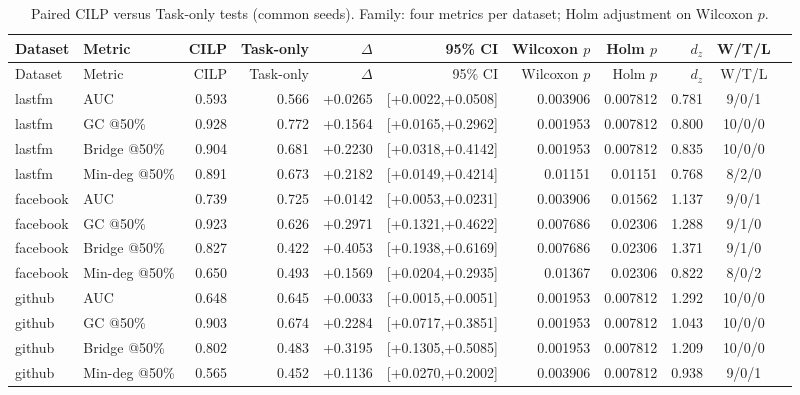 \begin{center}\scriptsize
\begin{longtable}{@{}llrrrrrrrcc@{}}
\caption{Paired CILP versus Task-only tests (common seeds). Family: four metrics per dataset; Holm adjustment on Wilcoxon $p$.}\\
\toprule
Dataset & Metric & CILP & Task-only & $\Delta$ & 95\% CI & Wilcoxon $p$ & Holm $p$ & $d_z$ & W/T/L \\
\midrule
\endfirsthead
\toprule
Dataset & Metric & CILP & Task-only & $\Delta$ & 95\% CI & Wilcoxon $p$ & Holm $p$ & $d_z$ & W/T/L \\
\midrule
\endhead
lastfm & AUC & 0.593 & 0.566 & +0.0265 & [+0.0022,+0.0508] & 0.003906 & 0.007812 & 0.781 & 9/0/1 \\
lastfm & GC @50\% & 0.928 & 0.772 & +0.1564 & [+0.0165,+0.2962] & 0.001953 & 0.007812 & 0.800 & 10/0/0 \\
lastfm & Bridge @50\% & 0.904 & 0.681 & +0.2230 & [+0.0318,+0.4142] & 0.001953 & 0.007812 & 0.835 & 10/0/0 \\
lastfm & Min-deg @50\% & 0.891 & 0.673 & +0.2182 & [+0.0149,+0.4214] & 0.01151 & 0.01151 & 0.768 & 8/2/0 \\
facebook & AUC & 0.739 & 0.725 & +0.0142 & [+0.0053,+0.0231] & 0.003906 & 0.01562 & 1.137 & 9/0/1 \\
facebook & GC @50\% & 0.923 & 0.626 & +0.2971 & [+0.1321,+0.4622] & 0.007686 & 0.02306 & 1.288 & 9/1/0 \\
facebook & Bridge @50\% & 0.827 & 0.422 & +0.4053 & [+0.1938,+0.6169] & 0.007686 & 0.02306 & 1.371 & 9/1/0 \\
facebook & Min-deg @50\% & 0.650 & 0.493 & +0.1569 & [+0.0204,+0.2935] & 0.01367 & 0.02306 & 0.822 & 8/0/2 \\
github & AUC & 0.648 & 0.645 & +0.0033 & [+0.0015,+0.0051] & 0.001953 & 0.007812 & 1.292 & 10/0/0 \\
github & GC @50\% & 0.903 & 0.674 & +0.2284 & [+0.0717,+0.3851] & 0.001953 & 0.007812 & 1.043 & 10/0/0 \\
github & Bridge @50\% & 0.802 & 0.483 & +0.3195 & [+0.1305,+0.5085] & 0.001953 & 0.007812 & 1.209 & 10/0/0 \\
github & Min-deg @50\% & 0.565 & 0.452 & +0.1136 & [+0.0270,+0.2002] & 0.003906 & 0.007812 & 0.938 & 9/0/1 \\
\bottomrule
\end{longtable}
\end{center}
